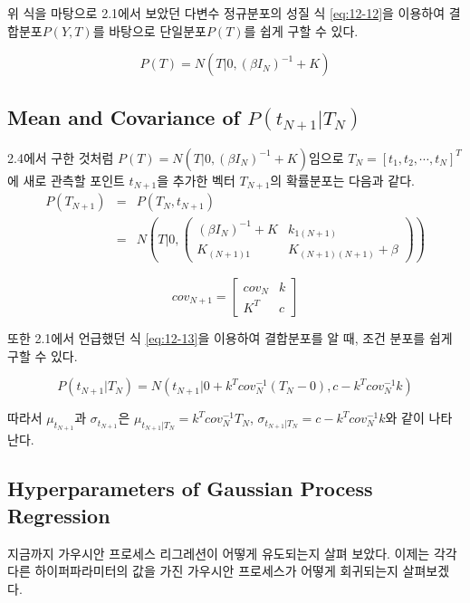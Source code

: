 \documentclass[a4paper]{oblivoir}
\begin{document}
위 식을 마탕으로 2.1에서 보았던 다변수 정규분포의 성질 식 \ref{eq:12-12}을 이용하여 결합분포$P(Y, T)$를 바탕으로 단일분포$P(T)$를 쉽게 구할 수 있다.

\begin{equation}
P(T) = N\left(T | 0, (\beta I_{N})^{-1} + K \right)
\label{eq:12-32}
\end{equation} 

\subsection{Mean and Covariance of \texorpdfstring{$P(t_{N+1}|T_{N})$}{Lg}}

2.4에서 구한 것처럼 $P(T) = N\left(T | 0, (\beta I_{N})^{-1} + K \right)$임으로 $T_{N} = [t_{1},t_{2}, \cdots , t_{N}]^{T}$에 새로 관측할 포인트 $t_{N+1}$을 추가한 벡터 $T_{N+1}$의 확률분포는 다음과 같다.
\begin{eqnarray}
P(T_{N+1}) & = & P(T_{N}, t_{N+1})\nonumber\\
& = & N\left(T | 0, \begin{pmatrix} (\beta I_{N})^{-1}+K & k_{1(N+1)} \\ K_{(N+1)1} & K_{(N+1)(N+1)} + \beta \end{pmatrix} \right)
\label{eq:12-33}
\end{eqnarray} 

\begin{equation}
cov_{N+1} = \begin{bmatrix} cov_{N} & k \\ K^{T} & c \end{bmatrix}
\label{eq:12-34}
\end{equation} 

또한 2.1에서 언급했던 식 \ref{eq:12-13}을 이용하여 결합분포를 알 때, 조건 분포를 쉽게 구할 수 있다. 

\begin{equation}
P(t_{N+1}|T_{N}) = N\left(t_{N+1} | 0 + k^{T}cov_{N}^{-1}(T_{N}-0), c- k^{T}cov_{N}^{-1}k \right)
\label{eq:12-35}
\end{equation} 

따라서 $\mu_{t_{N+1}}$과 $\sigma_{t_{N+1}}$은 $\mu_{t_{N+1}|T_{N}} =k^{T}cov_{N}^{-1}T_{N}$, $\sigma_{t_{N+1}|T_{N}} = c- k^{T}cov_{N}^{-1}k $와 같이 나타난다.

\subsection{Hyperparameters of Gaussian Process Regression}
지금까지 가우시안 프로세스 리그레션이 어떻게 유도되는지 살펴 보았다. 이제는 각각 다른 하이퍼파라미터의 값을 가진 가우시안 프로세스가 어떻게 회귀되는지 살펴보겠다.\\
\end{document}

